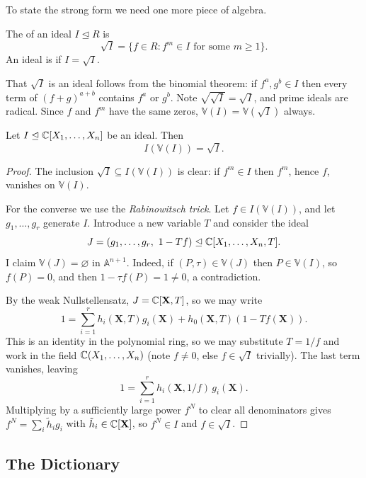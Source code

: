 \documentclass[a4paper]{scrartcl}
\newcommand{\A}{\mathbb{A}}
\newcommand{\V}{\mathbb{V}}
\begin{document}
To state the strong form we need one more piece of algebra.

\begin{definition}[Radical]
	The  of an ideal $I \trianglelefteq R$ is
	$$\sqrt{I} = \{f \in R : f^m \in I \text{ for some } m \geq 1\}.$$
	An ideal is  if $I = \sqrt{I}$.
\end{definition}

That $\sqrt I$ is an ideal follows from the binomial theorem: if $f^a, g^b \in I$ then every term of $(f+g)^{a+b}$ contains $f^a$ or $g^b$. Note $\sqrt{\sqrt I} = \sqrt I$, and prime ideals are radical. Since $f$ and $f^m$ have the same zeros, $\V(I) = \V(\sqrt I)$ always.

\begin{theorem}\label{thm:strongnss}
	Let $I \trianglelefteq \mathbb{C}[X_1,\dots,X_n]$ be an ideal. Then
	$$I(\V(I)) = \sqrt{I}.$$
\end{theorem}

\begin{proof}
	The inclusion $\sqrt I \subseteq I(\V(I))$ is clear: if $f^m \in I$ then $f^m$, hence $f$, vanishes on $\V(I)$.

	For the converse we use the \emph{Rabinowitsch trick}. Let $f \in I(\V(I))$, and let $g_1,\dots,g_r$ generate $I$. Introduce a new variable $T$ and consider the ideal
	$$J = (g_1,\dots,g_r,\ 1 - Tf) \trianglelefteq \C[X_1,\dots,X_n,T].$$
	I claim $\V(J) = \varnothing$ in $\A^{n+1}$. Indeed, if $(P,\tau) \in \V(J)$ then $P \in \V(I)$, so $f(P) = 0$, and then $1 - \tau f(P) = 1 \neq 0$, a contradiction.

	By the weak Nullstellensatz, $J = \mathbb{C}[\mathbf{X},T]$, so we may write
	$$1 = \sum_{i=1}^r h_i(\mathbf{X},T) g_i(\mathbf{X}) + h_0(\mathbf{X},T)(1 - Tf(\mathbf{X})).$$
	This is an identity in the polynomial ring, so we may substitute $T = 1/f$ and work in the field $\mathbb{C}(X_1,\dots,X_n)$ (note $f \neq 0$, else $f \in \sqrt I$ trivially). The last term vanishes, leaving
	$$1 = \sum_{i=1}^r h_i(\mathbf{X},1/f)\, g_i(\mathbf{X}).$$
	Multiplying by a sufficiently large power $f^N$ to clear all denominators gives $f^N = \sum_i \tilde{h}_i g_i$ with $\tilde h_i \in \mathbb{C}[\mathbf{X}]$, so $f^N \in I$ and $f \in \sqrt I$.
\end{proof}

\subsection{The Dictionary}
\end{document}
